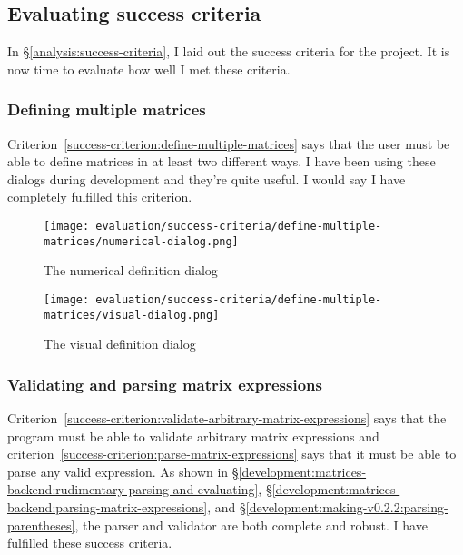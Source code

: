 \documentclass[../main.tex]{subfiles}
\begin{document}
\subsection{Evaluating success criteria\label{evaluation:evaluating-success-criteria}}

In \S\ref{analysis:success-criteria}, I laid out the success criteria for the project. It is now time to evaluate how well I met these criteria.

\subsubsection{Defining multiple matrices\label{evaluation:evaluating-success-criteria:define-multiple-matrices}}

Criterion~\ref{success-criterion:define-multiple-matrices} says that the user must be able to define matrices in at least two different ways. I have been using these dialogs during development and they're quite useful. I would say I have completely fulfilled this criterion.

\begin{figure}[H]
	\centering
	\texttt{[image: evaluation/success-criteria/define-multiple-matrices/numerical-dialog.png]}
	\caption{The numerical definition dialog}
	\label{fig:evaluation:success-criteria:define-multiple-matrices:numerical-dialog.png}
\end{figure}
\begin{figure}[H]
	\centering
	\texttt{[image: evaluation/success-criteria/define-multiple-matrices/visual-dialog.png]}
	\caption{The visual definition dialog}
	\label{fig:evaluation:success-criteria:define-multiple-matrices:visual-dialog.png}
\end{figure}

\subsubsection{Validating and parsing matrix expressions\label{evaluation:evaluating-success-criteria:validating-and-parsing-matrix-expressions}}

Criterion~\ref{success-criterion:validate-arbitrary-matrix-expressions} says that the program must be able to validate arbitrary matrix expressions and criterion~\ref{success-criterion:parse-matrix-expressions} says that it must be able to parse any valid expression. As shown in \S\ref{development:matrices-backend:rudimentary-parsing-and-evaluating}, \S\ref{development:matrices-backend:parsing-matrix-expressions}, and \S\ref{development:making-v0.2.2:parsing-parentheses}, the parser and validator are both complete and robust. I have fulfilled these success criteria.
\end{document}
